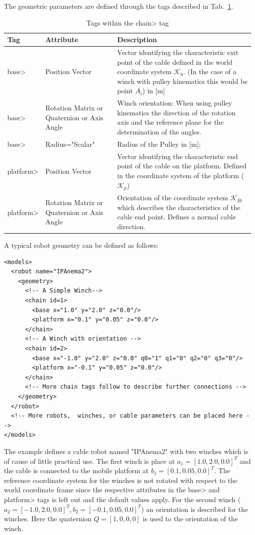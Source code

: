 The geometric parameters are defined through the tags described in
Tab.~\ref{tab:XmlChainSubTag}.

\begin{table}
  \centering
  \caption{Tags within the \<chain> tag}
  \label{tab:XmlChainSubTag}
  \begin{tabular}{p{}p{}p{}}
    \hline\hline
    Tag & Attribute & Description \\
    \hline
    \<base> & Position Vector & Vector identifying the characteristic exit point of the cable defined in the world coordinate system $\mathcal K_0$. (In the case of a winch with pulley kinematics this would be point $A_i$) in [m]\\
    \<base> & Rotation Matrix or Quaternion or Axis Angle & Winch orientation: When using pulley kinematics the direction of the rotation axis and the reference plane for the determination of the angles.\\
    \<base> & Radius="Scalar" & Radius of the Pulley in [m];\\
    \<platform> & Position Vector & Vector identifying the characteristic end point of the cable on the platform. Defined in the coordinate system of the platform ($\mathcal K_p$)\\
    \<platform> & Rotation Matrix or Quaternion or Axis Angle & Orientation of the coordinate system $\mathcal K_{Bi}$ which describes the characteristics of the cable end point. Defines a normal cable direction.\\
    \hline\hline
  \end{tabular}
\end{table}

A typical robot geometry can be defined as follows:
\begin{verbatim}
<models>
  <robot name="IPAnema2">
    <geometry>
      <!-- A Simple Winch-->
      <chain id=1>
        <base x="1.0" y="2.0" z="0.0"/>
        <platform x="0.1" y="0.05" z="0.0"/>
      </chain>
      <!-- A Winch with orientation -->
      <chain id=2>
        <base x="-1.0" y="2.0" z="0.0" q0="1" q1="0" q2="0" q3="0"/>
        <platform x="-0.1" y="0.05" z="0.0"/>
      </chain>
      <!-- More chain tags follow to describe further connections -->
    </geometry>
  </robot>
  <!-- More robots,  winches, or cable parameters can be placed here -->
</models>
\end{verbatim}
The example defines a cable robot named "IPAnema2" with two winches which is of
cause of little practical use. The first winch is place at $a_1=[1.0, 2.0
,0.0]^T$ and the cable is connected to the mobile platform at $b_1=[0.1,
0.05, 0.0]^T$. The reference coordinate system for the winches is not rotated
with respect to the world coordinate frame since the respective attributes in
the \<base> and \<platform> tags is left out and the default values apply. For
the second winch ($a_2=[-1.0, 2.0, 0.0]^T, b_2=[-0.1, 0.05,
0.0]^T$) an orientation is described for the winches. Here the quaternion
$Q=[1,0,0,0]$ is used to the orientation of the winch.

